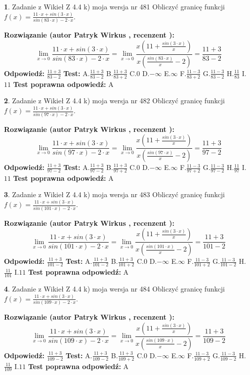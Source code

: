 \documentclass[12pt, a4paper]{article}
\theoremstyle{definition} %
\newtheorem{zad}{}
\newcommand{\zadStart}[1]{\begin{zad}#1\newline}
\newcommand{\zadStop}{\end{zad}}
\newcommand{\rozwStart}[2]{\noindent \textbf{Rozwiązanie (autor #1 , recenzent #2): }\newline}
\newcommand{\rozwStop}{\newline}
\newcommand{\odpStart}{\noindent \textbf{Odpowiedź:}\newline}
\newcommand{\odpStop}{\newline}
\newcommand{\testStart}{\noindent \textbf{Test:}\newline}
\newcommand{\testStop}{\newline}
\newcommand{\kluczStart}{\noindent \textbf{Test poprawna odpowiedź:}\newline}
\newcommand{\kluczStop}{\newline}
\begin{document}
\zadStart{Zadanie z Wikieł Z 4.4 k) moja wersja nr 481}
Obliczyć granicę funkcji $f(x)=\frac{11\cdot x +sin(3\cdot x)}{sin(83\cdot x) -2\cdot x}$.
\zadStop
\rozwStart{Patryk Wirkus}{}
$$\lim\limits_{x\to 0}\frac{11\cdot x +sin(3\cdot x)}{sin(83\cdot x) -2\cdot x}
=\lim\limits_{x\to 0}\frac{x(11+\frac{sin(3\cdot x)}{x})}{x(\frac{sin(83\cdot x)}{x}-2)}
=\frac{11+3}{83-2}$$
\rozwStop
\odpStart
$\frac{11+3}{83-2}$
\odpStop
\testStart
A.$\frac{11+3}{83-2}$
B.$\frac{11+3}{83+2}$
C.$0$
D.$-\infty$
E.$\infty$
F.$\frac{11-3}{83+2}$
G.$\frac{11-3}{83-2}$
H.$\frac{11}{83}$
I.$11$
\testStop
\kluczStart
A
\kluczStop



\zadStart{Zadanie z Wikieł Z 4.4 k) moja wersja nr 482}
Obliczyć granicę funkcji $f(x)=\frac{11\cdot x +sin(3\cdot x)}{sin(97\cdot x) -2\cdot x}$.
\zadStop
\rozwStart{Patryk Wirkus}{}
$$\lim\limits_{x\to 0}\frac{11\cdot x +sin(3\cdot x)}{sin(97\cdot x) -2\cdot x}
=\lim\limits_{x\to 0}\frac{x(11+\frac{sin(3\cdot x)}{x})}{x(\frac{sin(97\cdot x)}{x}-2)}
=\frac{11+3}{97-2}$$
\rozwStop
\odpStart
$\frac{11+3}{97-2}$
\odpStop
\testStart
A.$\frac{11+3}{97-2}$
B.$\frac{11+3}{97+2}$
C.$0$
D.$-\infty$
E.$\infty$
F.$\frac{11-3}{97+2}$
G.$\frac{11-3}{97-2}$
H.$\frac{11}{97}$
I.$11$
\testStop
\kluczStart
A
\kluczStop



\zadStart{Zadanie z Wikieł Z 4.4 k) moja wersja nr 483}
Obliczyć granicę funkcji $f(x)=\frac{11\cdot x +sin(3\cdot x)}{sin(101\cdot x) -2\cdot x}$.
\zadStop
\rozwStart{Patryk Wirkus}{}
$$\lim\limits_{x\to 0}\frac{11\cdot x +sin(3\cdot x)}{sin(101\cdot x) -2\cdot x}
=\lim\limits_{x\to 0}\frac{x(11+\frac{sin(3\cdot x)}{x})}{x(\frac{sin(101\cdot x)}{x}-2)}
=\frac{11+3}{101-2}$$
\rozwStop
\odpStart
$\frac{11+3}{101-2}$
\odpStop
\testStart
A.$\frac{11+3}{101-2}$
B.$\frac{11+3}{101+2}$
C.$0$
D.$-\infty$
E.$\infty$
F.$\frac{11-3}{101+2}$
G.$\frac{11-3}{101-2}$
H.$\frac{11}{101}$
I.$11$
\testStop
\kluczStart
A
\kluczStop



\zadStart{Zadanie z Wikieł Z 4.4 k) moja wersja nr 484}
Obliczyć granicę funkcji $f(x)=\frac{11\cdot x +sin(3\cdot x)}{sin(109\cdot x) -2\cdot x}$.
\zadStop
\rozwStart{Patryk Wirkus}{}
$$\lim\limits_{x\to 0}\frac{11\cdot x +sin(3\cdot x)}{sin(109\cdot x) -2\cdot x}
=\lim\limits_{x\to 0}\frac{x(11+\frac{sin(3\cdot x)}{x})}{x(\frac{sin(109\cdot x)}{x}-2)}
=\frac{11+3}{109-2}$$
\rozwStop
\odpStart
$\frac{11+3}{109-2}$
\odpStop
\testStart
A.$\frac{11+3}{109-2}$
B.$\frac{11+3}{109+2}$
C.$0$
D.$-\infty$
E.$\infty$
F.$\frac{11-3}{109+2}$
G.$\frac{11-3}{109-2}$
H.$\frac{11}{109}$
I.$11$
\testStop
\kluczStart
A
\kluczStop
\end{document}

